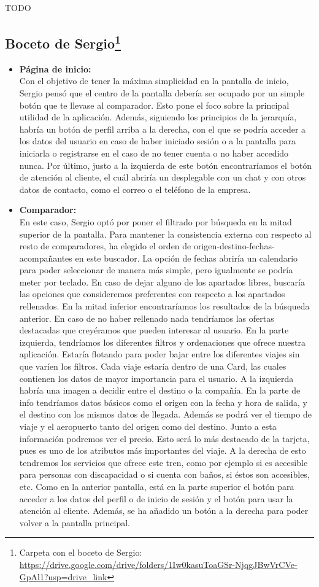 TODO

\subsection[Boceto de Sergio]{Boceto de Sergio\footnote{Carpeta con el boceto de Sergio: \url{https://drive.google.com/drive/folders/1Iw0kasuToaGSr-NjqgJBwVrCVe-GpAl1?usp=drive_link}}}

\begin{itemize}
    \item\textbf{Página de inicio:} \\ Con el objetivo de tener la máxima simplicidad en la pantalla de inicio, Sergio pensó que el centro de la pantalla debería ser ocupado por un simple botón que te llevase al comparador. Esto pone el foco sobre la principal utilidad de la aplicación. Además, siguiendo los principios de la jerarquía, habría un botón de perfil arriba a la derecha, con el que se podría acceder a los datos del usuario en caso de haber iniciado sesión o a la pantalla para iniciarla o registrarse en el caso de no tener cuenta o no haber accedido nunca. Por último, justo a la izquierda de este botón encontraríamos el botón de atención al cliente, el cuál abriría un desplegable con un chat y con otros datos de contacto, como el correo o el teléfono de la empresa.
    \item\textbf{Comparador:} \\ En este caso, Sergio optó por poner el filtrado por búsqueda en la mitad superior de la pantalla. Para mantener la consistencia externa con respecto al resto de comparadores, ha elegido el orden de origen-destino-fechas-acompañantes en este buscador. La opción de fechas abriría un calendario para poder seleccionar de manera más simple, pero igualmente se podría meter por teclado. En caso de dejar alguno de los apartados libres, buscaría las opciones que consideremos preferentes con respecto a los apartados rellenados. En la mitad inferior encontraríamos los resultados de la búsqueda anterior. En caso de no haber rellenado nada tendríamos las ofertas destacadas que creyéramos que pueden interesar al usuario. En la parte izquierda, tendríamos los diferentes filtros y ordenaciones que ofrece nuestra aplicación. Estaría flotando para poder bajar entre los diferentes viajes sin que varíen los filtros. Cada viaje estaría dentro de una Card, las cuales contienen los datos de mayor importancia para el usuario. A la izquierda habría una imagen a decidir entre el destino o la compañía. En la parte de info tendríamos datos básicos como el origen con la fecha y hora de salida, y el destino con los mismos datos de llegada. Además se podrá ver el tiempo de viaje y el aeropuerto tanto del origen como del destino. Junto a esta información podremos ver el precio. Esto será lo más destacado de la tarjeta, pues es uno de los atributos más importantes del viaje. A la derecha de esto tendremos los servicios que ofrece este tren, como por ejemplo si es accesible para personas con discapacidad o si cuenta con baños, si éstos son accesibles, etc. Como en la anterior pantalla, está en la parte superior el botón para acceder a los datos del perfil o de inicio de sesión y el botón para usar la atención al cliente. Además, se ha añadido un botón a la derecha para poder volver a la pantalla principal.

\end{itemize}
